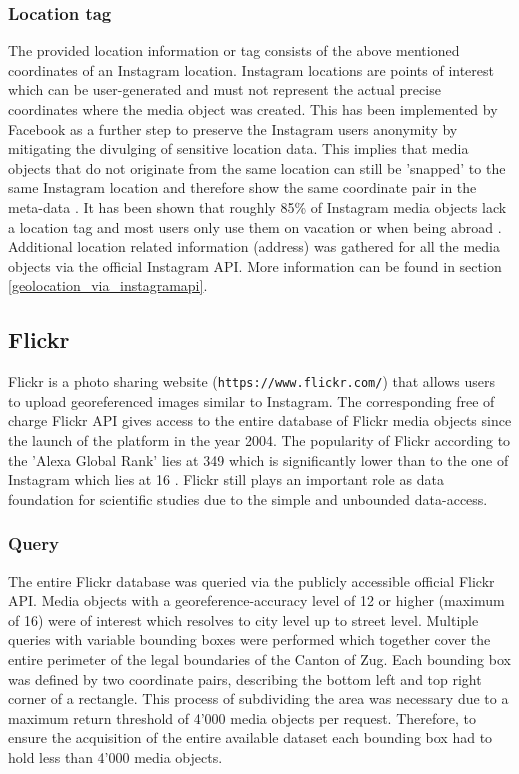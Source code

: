 \subsubsection*{Location tag} \label{instagram_location_tag}
The provided location information or tag consists of the above mentioned coordinates of an Instagram location. Instagram locations are points of interest which can be user-generated and must not represent the actual precise coordinates where the media object was created. This has been implemented by Facebook as a further step to preserve the Instagram users anonymity by mitigating the divulging of sensitive location data. This implies that media objects that do not originate from the same location can still be 'snapped' to the same Instagram location and therefore show the same coordinate pair in the meta-data \parencite{Instagram}.
It has been shown that roughly 85\% of Instagram media objects lack a location tag and most users only use them on vacation or when being abroad \parencite{Flatow2015}.
Additional location related information (address) was gathered for all the media objects via the official Instagram API. More information can be found in section \ref{geolocation_via_instagramapi}.

\subsection{Flickr} \label{flickr}
Flickr is a photo sharing website (\texttt{https://www.flickr.com/}) that allows users to upload georeferenced images similar to Instagram. The corresponding free of charge Flickr API gives access to the entire database of Flickr media objects since the launch of the platform in the year 2004. The popularity of Flickr according to the 'Alexa Global Rank' lies at 349 \parencite{Alexa.com2019a} which is significantly lower than to the one of Instagram which lies at 16 \parencite{Alexa.com2019}. Flickr still plays an important role as data foundation for scientific studies due to the simple and unbounded data-access. 
\subsubsection*{Query} \label{flickr_query}
The entire Flickr database was queried via the publicly accessible official Flickr API. Media objects with a georeference-accuracy level of 12 or higher (maximum of 16) were of interest which resolves to city level up to street level. Multiple queries with variable bounding boxes were performed which together cover the entire perimeter of the legal boundaries of the Canton of Zug. Each bounding box was defined by two coordinate pairs, describing the bottom left and top right corner of a rectangle. This process of subdividing the area was necessary due to a maximum return threshold of 4'000 media objects per request. Therefore, to ensure the acquisition of the entire available dataset each bounding box had to hold less than 4'000 media objects.

